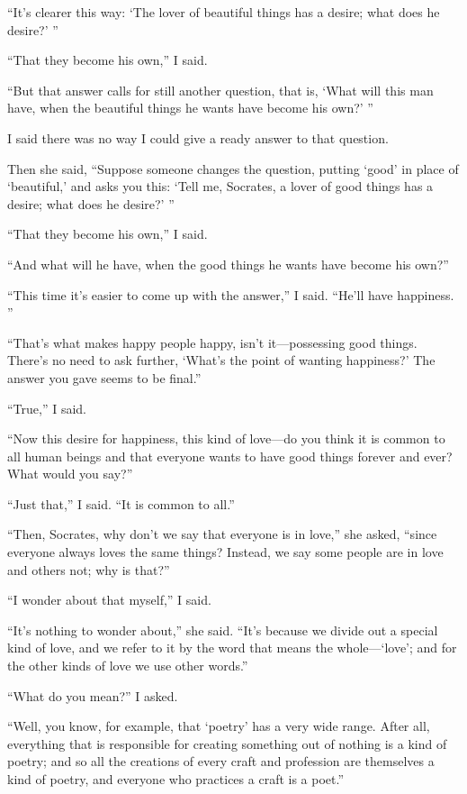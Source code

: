 “It's clearer this way: ‘The lover of beautiful things has a desire;
what does he desire?' ”

“That they become his own,” I said.

“But that answer calls for still another question, that is, ‘What will
this man have, when the beautiful things he wants have become his own?'
”

I said there was no way I could give a ready answer to that question.

Then she said, “Suppose someone changes the question, putting ‘good' in
place of ‘beautiful,' and asks you this: ‘Tell me, Socrates, a lover of
good things has a desire; what does he desire?' ”

“That they become his own,” I said.

“And what will he have, when the good things he wants have become his
own?”

“This time it's easier to come up with the answer,” I said. “He'll have
happiness.
”

“That's what makes happy people happy, isn't it---possessing good
things. There's no need to ask further, ‘What's the point of wanting
happiness?' The answer you gave seems to be final.”

“True,” I said.

“Now this desire for happiness, this kind of love---do you think it is
common to all human beings and that everyone wants to have good things
forever and ever? What would you say?”

“Just that,” I said. “It is common to all.”

 “Then, Socrates, why don't we say that everyone is in love,” she
asked, “since everyone always loves the same things? Instead, we say
some people are in love and others not; why is that?”

“I wonder about that myself,” I said.

“It's nothing to wonder about,” she said. “It's because we divide out a
special kind of love, and we refer to it by the word that means the
whole---‘love'; and for the other kinds of love we use other words.”

“What do you mean?” I asked.

“Well, you know, for example, that ‘poetry' has a very wide
range. After all,
everything that is responsible for creating something out of 
nothing is a kind of poetry; and so all the creations of every craft and
profession are themselves a kind of poetry, and everyone who practices a
craft is a poet.”

